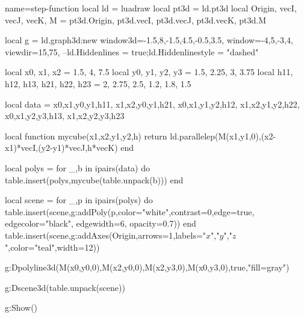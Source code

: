 \documentclass{standalone}
\begin{document}
\begin{luadraw}{name=step-function}
local ld = luadraw
local pt3d = ld.pt3d
local Origin, vecI, vecJ, vecK, M = pt3d.Origin, pt3d.vecI, pt3d.vecJ, pt3d.vecK, pt3d.M

local g = ld.graph3d:new{
    window3d={-1.5,8,-1.5,4.5,-0.5,3.5}, 
    window={-4,5,-3,4}, 
    viewdir={15,75}, 
}
--ld.Hiddenlines = true;ld.Hiddenlinestyle = "dashed"

local x0, x1, x2 = 1.5, 4, 7.5
local y0, y1, y2, y3 = 1.5, 2.25, 3, 3.75
local h11, h12, h13, h21, h22, h23 = 2, 2.75, 2.5, 1.2, 1.8, 1.5

local data = {
    {x0,x1,y0,y1,h11},
    {x1,x2,y0,y1,h21},
    {x0,x1,y1,y2,h12},
    {x1,x2,y1,y2,h22},
    {x0,x1,y2,y3,h13},
    {x1,x2,y2,y3,h23}
}

local function mycube(x1,x2,y1,y2,h)
    return ld.parallelep(M(x1,y1,0),(x2-x1)*vecI,(y2-y1)*vecJ,h*vecK)
end

local polys = {}
for _,b in ipairs(data) do
    table.insert(polys,mycube(table.unpack(b)))
end

local scene = {}
for _,p in ipairs(polys) do
    table.insert(scene,g:addPoly(p,{color="white",contrast=0,edge=true,
        edgecolor="black", edgewidth=6, opacity=0.7}))
end
table.insert(scene,g:addAxes(Origin,{arrows=1,labels={"$x$","$y$","$z$"},color="teal",width=12}))

g:Dpolyline3d({M(x0,y0,0),M(x2,y0,0),M(x2,y3,0),M(x0,y3,0)},true,"fill=gray")

g:Dscene3d(table.unpack(scene))

g:Show()
\end{luadraw}
\end{document}
